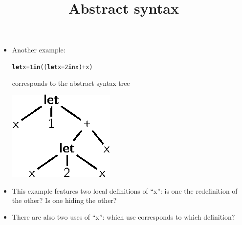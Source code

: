 \documentclass[wide]{slides}
\begin{document}
\begin{slide}
  \title{Abstract syntax}

  \begin{itemize}

  \item Another example:
\begin{alltt}
\textbf{let} x = 1 \textbf{in} ((\textbf{let} x = 2 \textbf{in} x) + x)
\end{alltt}
    corresponds to the abstract syntax tree
    \begin{center}
      \includegraphics[bb=71 658 160 721]{arith_tree3.eps}
    \end{center}

    \item This example features two local definitions of ``x'': is one
      the redefinition of the other? Is one hiding the other?

    \item There are also two uses of ``x'': which use corresponds to
      which definition?

  \end{itemize}

\end{slide}
\end{document}
